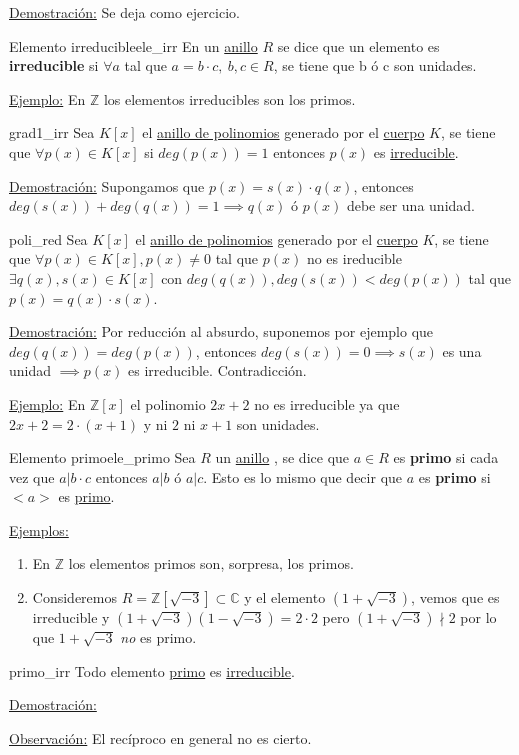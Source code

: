 \documentclass[10pt, a4paper]{article}
\newcommand{\Z}{\mathbb{Z}}
\newcommand{\C}{\mathbb{C}}
\newcommand{\obs}{\underline{Observación:} }
\newcommand{\ej}{\underline{Ejemplo:} }
\newcommand{\ejs}{\underline{Ejemplos:} }
\newcommand{\demo}{\underline{Demostración:} }
\newcommand{\anillo}[1][]{\hyperref[def:anillo]{anillo}#1 }
\newcommand{\cuerpo}[1][]{\hyperref[def:cuerpo]{cuerpo}#1 }
\newenvironment{enumeratea}{\begin{enumerate}[label=\arabic*)]}
{\end{enumerate}}
\begin{document}
\demo Se deja como ejercicio.

\begin{definition}{Elemento irreducible}{ele_irr}
En un \anillo $R$ se dice que un elemento es \textbf{irreducible} si $\forall a$ tal que $a = b \cdot c,\ b, c \in R$, se tiene que b ó c son unidades.
\end{definition}

\ej En $\Z$ los elementos irreducibles son los primos.

\begin{proposition}{}{grad1_irr}
Sea $K[x]$ el \hyperref[def:anillopoli]{anillo de polinomios} generado por el \cuerpo $K$, se tiene que $\forall p(x) \in K[x]$ si $deg(p(x)) = 1$ entonces $p(x)$ es \hyperref[def:ele_irr]{irreducible}.
\end{proposition}

\demo Supongamos que $p(x) = s(x) \cdot q(x)$, entonces $deg(s(x)) + deg(q(x)) = 1 \implies q(x) \text{ ó } p(x)$ debe ser una unidad.

\begin{proposition}{}{poli_red}
Sea $K[x]$ el \hyperref[def:anillopoli]{anillo de polinomios} generado por el \cuerpo $K$, se tiene que $\forall p(x) \in K[x], p(x) \neq 0$ tal que $p(x)$ no es ireducible $\exists q(x), s(x) \in K[x]$ con $deg(q(x)), deg(s(x)) < deg(p(x))$ tal que $p(x) = q(x) \cdot s(x)$.
\end{proposition}

\demo Por reducción al absurdo, suponemos por ejemplo que $deg(q(x)) = deg(p(x))$, entonces $deg(s(x)) = 0 \implies s(x)$ es una unidad $\implies p(x)$ es irreducible. Contradicción.

\ej En $\Z[x]$ el polinomio $2x + 2$ no es irreducible ya que $2x + 2 = 2 \cdot (x + 1)$ y ni $2$ ni $x + 1$ son unidades.

\begin{definition}{Elemento primo}{ele_primo}
Sea $R$ un \anillo, se dice que $a \in R$ es \textbf{primo} si cada vez que $a | b \cdot c$ entonces $a | b$ ó $a | c$. Esto es lo mismo que decir que $a$ es \textbf{primo} si $<a>$ es \hyperref[def:ideal_primo]{primo}.
\end{definition}

\ejs

\begin{enumeratea}
	\item En $\Z$ los elementos primos son, sorpresa, los primos.
	\item Consideremos $R = \Z[\sqrt{-3}] \subset \C$ y el elemento $(1 + \sqrt{-3})$, vemos que es irreducible y $(1 + \sqrt{-3})(1 - \sqrt{-3}) = 2 \cdot 2$ pero $(1 + \sqrt{-3}) \nmid 2$ por lo que $1 + \sqrt{-3}$ \emph{no} es primo.
\end{enumeratea}

\begin{proposition}{}{primo_irr}
Todo elemento \hyperref[def:ele_primo]{primo} es \hyperref[def:ele_irr]{irreducible}.
\end{proposition}

\demo

\vspace{3mm}

\obs El recíproco en general no es cierto.
\end{document}
